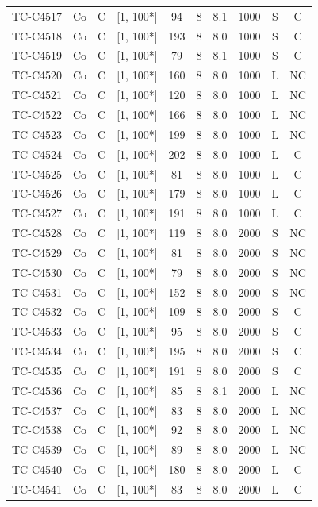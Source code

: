\begin{longtable}{lccccccccc}
TC-C4517 & Co & C & [1, 100*] & 94 & 8 & 8.1 & 1000 & S & C \\
TC-C4518 & Co & C & [1, 100*] & 193 & 8 & 8.0 & 1000 & S & C \\
TC-C4519 & Co & C & [1, 100*] & 79 & 8 & 8.1 & 1000 & S & C \\
TC-C4520 & Co & C & [1, 100*] & 160 & 8 & 8.0 & 1000 & L & NC \\
TC-C4521 & Co & C & [1, 100*] & 120 & 8 & 8.0 & 1000 & L & NC \\
TC-C4522 & Co & C & [1, 100*] & 166 & 8 & 8.0 & 1000 & L & NC \\
TC-C4523 & Co & C & [1, 100*] & 199 & 8 & 8.0 & 1000 & L & NC \\
TC-C4524 & Co & C & [1, 100*] & 202 & 8 & 8.0 & 1000 & L & C \\
TC-C4525 & Co & C & [1, 100*] & 81 & 8 & 8.0 & 1000 & L & C \\
TC-C4526 & Co & C & [1, 100*] & 179 & 8 & 8.0 & 1000 & L & C \\
TC-C4527 & Co & C & [1, 100*] & 191 & 8 & 8.0 & 1000 & L & C \\
TC-C4528 & Co & C & [1, 100*] & 119 & 8 & 8.0 & 2000 & S & NC \\
TC-C4529 & Co & C & [1, 100*] & 81 & 8 & 8.0 & 2000 & S & NC \\
TC-C4530 & Co & C & [1, 100*] & 79 & 8 & 8.0 & 2000 & S & NC \\
TC-C4531 & Co & C & [1, 100*] & 152 & 8 & 8.0 & 2000 & S & NC \\
TC-C4532 & Co & C & [1, 100*] & 109 & 8 & 8.0 & 2000 & S & C \\
TC-C4533 & Co & C & [1, 100*] & 95 & 8 & 8.0 & 2000 & S & C \\
TC-C4534 & Co & C & [1, 100*] & 195 & 8 & 8.0 & 2000 & S & C \\
TC-C4535 & Co & C & [1, 100*] & 191 & 8 & 8.0 & 2000 & S & C \\
TC-C4536 & Co & C & [1, 100*] & 85 & 8 & 8.1 & 2000 & L & NC \\
TC-C4537 & Co & C & [1, 100*] & 83 & 8 & 8.0 & 2000 & L & NC \\
TC-C4538 & Co & C & [1, 100*] & 92 & 8 & 8.0 & 2000 & L & NC \\
TC-C4539 & Co & C & [1, 100*] & 89 & 8 & 8.0 & 2000 & L & NC \\
TC-C4540 & Co & C & [1, 100*] & 180 & 8 & 8.0 & 2000 & L & C \\
TC-C4541 & Co & C & [1, 100*] & 83 & 8 & 8.0 & 2000 & L & C \\

\end{longtable}
